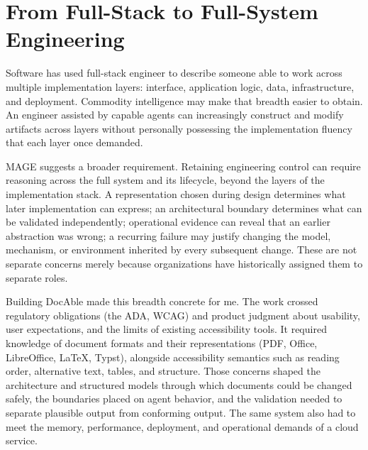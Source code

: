 \section{From Full-Stack to Full-System Engineering}\label{heading:from-full-stack-to-full-system-engineering}


Software has used full-stack engineer to describe someone able to work across multiple implementation layers: interface, application logic, data, infrastructure, and deployment. Commodity intelligence may make that breadth easier to obtain. An engineer assisted by capable agents can increasingly construct and modify artifacts across layers without personally possessing the implementation fluency that each layer once demanded.


MAGE suggests a broader requirement. Retaining engineering control can require reasoning across the full system and its lifecycle, beyond the layers of the implementation stack. A representation chosen during design determines what later implementation can express; an architectural boundary determines what can be validated independently; operational evidence can reveal that an earlier abstraction was wrong; a recurring failure may justify changing the model, mechanism, or environment inherited by every subsequent change. These are not separate concerns merely because organizations have historically assigned them to separate roles.


Building DocAble made this breadth concrete for me. The work crossed regulatory obligations (the ADA, WCAG) and product judgment about usability, user expectations, and the limits of existing accessibility tools. It required knowledge of document formats and their representations (PDF, Office, LibreOffice, LaTeX, Typst), alongside accessibility semantics such as reading order, alternative text, tables, and structure. Those concerns shaped the architecture and structured models through which documents could be changed safely, the boundaries placed on agent behavior, and the validation needed to separate plausible output from conforming output. The same system also had to meet the memory, performance, deployment, and operational demands of a cloud service.

